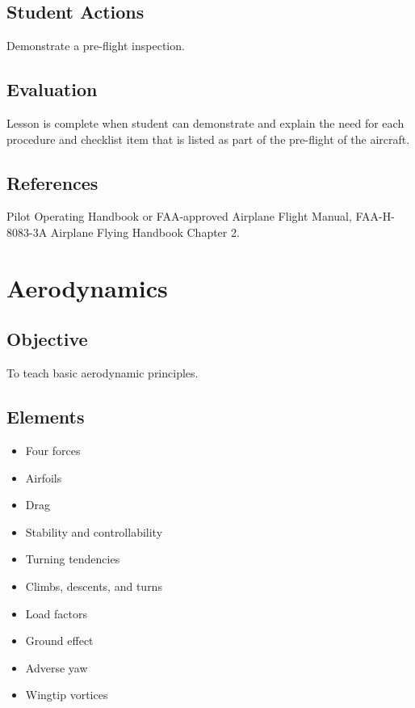 \documentclass[twoside,openright]{report}
\begin{document}
\section{Student Actions}

Demonstrate a pre-flight inspection.

\section{Evaluation}

Lesson is complete when student can demonstrate and explain the need for each
procedure and checklist item that is listed as part of the pre-flight of the
aircraft.

\section{References}

Pilot Operating Handbook or FAA-approved Airplane Flight Manual, FAA-H-8083-3A
Airplane Flying Handbook Chapter 2.

\chapter{Aerodynamics}

\section{Objective}

To teach basic aerodynamic principles.

\section{Elements}

\begin{itemize}
  \item Four forces
  \item Airfoils
  \item Drag
  \item Stability and controllability
  \item Turning tendencies
  \item Climbs, descents, and turns
  \item Load factors
  \item Ground effect
  \item Adverse yaw
  \item Wingtip vortices
\end{itemize}
\end{document}
